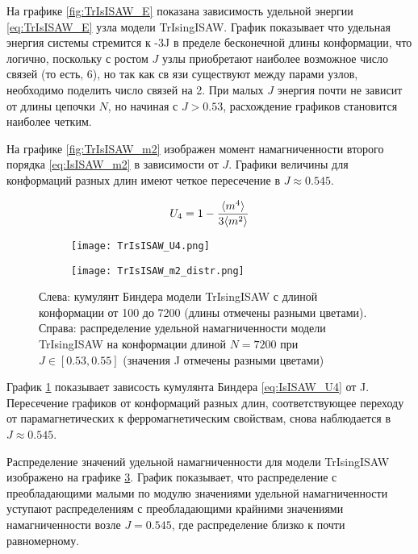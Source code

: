 На графике \ref{fig:TrIsISAW_E} показана зависимость удельной энергии \eqref{eq:TrIsISAW_E} узла модели TrIsingISAW.
График показывает что удельная энергия системы стремится к -3J в пределе бесконечной длины конформации, 
что логично, поскольку с ростом $J$ узлы приобретают наиболее возможное число связей (то есть, 6), но так как св
язи существуют между парами узлов,
необходимо поделить число связей на 2.
При малых $J$ энергия почти не зависит от длины цепочки $N$, но начиная с $J > 0.53$, расхождение графиков становится наиболее четким.

На графике \ref{fig:TrIsISAW_m2} изображен момент намагниченности второго порядка \eqref{eq:IsISAW_m2} в зависимости от $J$.
Графики величины для конформаций разных длин имеют четкое пересечение в $J \approx 0.545$.

\begin{equation}
\label{eq:IsISAW_U4}
	U_4 = 1 - \frac{\langle m^4 \rangle}{3 \langle m^2 \rangle}
\end{equation}

\begin{figure}[h]
\begin{subfigure}{0.49\textwidth}
\texttt{[image: TrIsISAW\_U4.png]}
\caption{}
\label{fig:TrIsISAW_U4}
\end{subfigure}
\hfill
\begin{subfigure}{0.49\textwidth}
\texttt{[image: TrIsISAW\_m2\_distr.png]}
\caption{}
\label{fig:TrIsISAW_m2_distr}
\end{subfigure}
\caption{Слева: кумулянт Биндера модели TrIsingISAW с длиной конформации от 100 до 7200 (длины отмечены разными цветами).
Справа: распределение удельной намагниченности модели TrIsingISAW на конформации длиной $N=7200$ при $J \in [0.53,0.55]$ (значения J отмечены разными цветами)}
\end{figure}


График \ref{fig:TrIsISAW_U4} показывает зависость кумулянта Биндера \eqref{eq:IsISAW_U4} от J. 
Пересечение графиков от конформаций разных длин, соответствующее переходу от парамагнетических к ферромагнетическим свойствам, снова наблюдается в $J \approx 0.545$.

Распределение значений удельной намагниченности для модели TrIsingISAW изображено на графике \ref{fig:TrIsISAW_m2_distr}.
График показывает, что распределение с преобладающими малыми по модулю значениями удельной намагниченности уступают 
распределениям с преобладающими крайними значениями намагниченности возле $J=0.545$, где распределение близко к почти равномерному.


